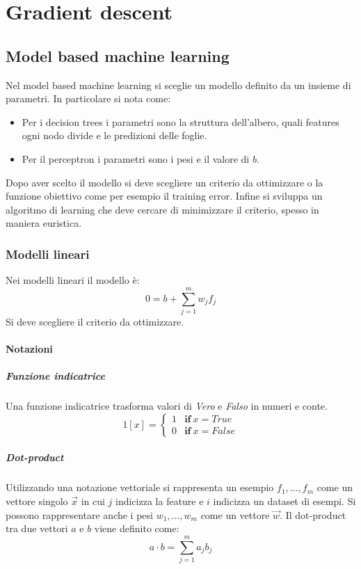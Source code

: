 \chapter{Gradient descent}

\section{Model based machine learning}
Nel model based machine learning si sceglie un modello definito da un insieme di parametri.
In particolare si nota come:
\begin{multicols}{2}
	\begin{itemize}
		\item Per i decision trees i parametri sono la struttura dell'albero, quali features ogni nodo divide e le predizioni delle foglie.
		\item Per il perceptron i parametri sono i pesi e il valore di $b$.
	\end{itemize}
\end{multicols}
Dopo aver scelto il modello si deve scegliere un criterio da ottimizzare o la funzione obiettivo come per esempio il training error.
Infine si sviluppa un algoritmo di learning che deve cercare di minimizzare il criterio, spesso in maniera euristica.

	\subsection{Modelli lineari}
	Nei modelli lineari il modello \`e:
	$$0=b+\sum\limits_{j=1}^mw_jf_j$$
	Si deve scegliere il criterio da ottimizzare.

		\subsubsection{Notazioni}

			\paragraph{Funzione indicatrice}
			Una funzione indicatrice trasforma valori di \emph{Vero} e \emph{Falso} in numeri e conte.
			$$1[x]=\begin{cases}1&\mathbf{if}\ x = True\\
										  	0&\textbf{if}\ x = False
				 	\end{cases}$$

			\paragraph{Dot-product}
			Utilizzando una notazione vettoriale si rappresenta un esempio $f_1,\dots,f_m$ come un vettore singolo $\overrightarrow{x}$ in cui $j$ indicizza la feature e $i$ indicizza un dataset di esempi.
			Si possono rappresentare anche i pesi $w_1,\dots,w_m$ come un vettore $\overrightarrow{w}$.
			Il dot-product tra due vettori $a$ e $b$ viene definito come:
			$$a\cdot b = \sum\limits_{j=1}^ma_jb_j$$

